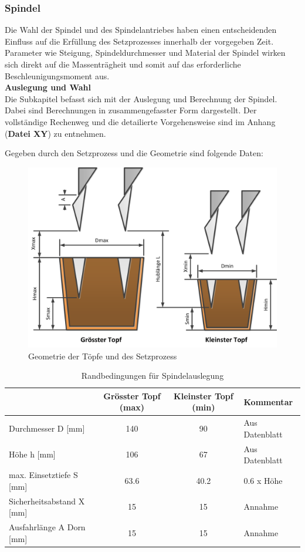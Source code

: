 \subsubsection{Spindel}
Die Wahl der Spindel und des Spindelantriebes haben einen entscheidenden Einfluss auf die Erfüllung des Setzprozesses innerhalb der vorgegeben Zeit. Parameter wie Steigung, Spindeldurchmesser und Material der Spindel wirken sich direkt auf die Massenträgheit und somit auf das erforderliche Beschleunigungsmoment aus.
 \\
 \newline
\textbf{Auslegung und Wahl}
 \\
Die Subkapitel befasst sich mit der Auslegung und Berechnung der Spindel. Dabei sind Berechnungen in zusammengefasster Form dargestellt. Der vollständige Rechenweg und die detailierte Vorgehensweise sind im Anhang (\textbf{Datei XY}) zu entnehmen.

Gegeben durch den Setzprozess und die Geometrie sind folgende Daten:
	\begin{figure}[H]
	\includegraphics[width=1\textwidth]{Illustrationen/6-Umsetzung/topfgeometrie.png}
	\caption{Geometrie der Töpfe und des Setzprozess}
	\label{fig:topfgeometrie}
	\end{figure}
\begin{table}[H]
\begin{tabular}{|l|c|c|l|}
	\hline 
	& Grösster Topf (max) & Kleinster Topf (min) & Kommentar \\ 
	\hline 
	Durchmesser D [mm] & 140 & 90 & Aus Datenblatt \\ 
	\hline 
	Höhe h [mm] & 106 & 67 & Aus Datenblatt \\ 
	\hline 
	max. Einsetztiefe S [mm] & 63.6 & 40.2 & 0.6 x Höhe \\ 
	\hline 
	Sicherheitsabstand X [mm] & 15 & 15 & Annahme \\ 
	\hline 
	Ausfahrlänge A Dorn [mm] & 15 & 15 & Annahme \\ 
	\hline 
\end{tabular} 
	\caption{Randbedingungen für Spindelauslegung}
	\label{tab:Randbedingungen}
\end{table}

